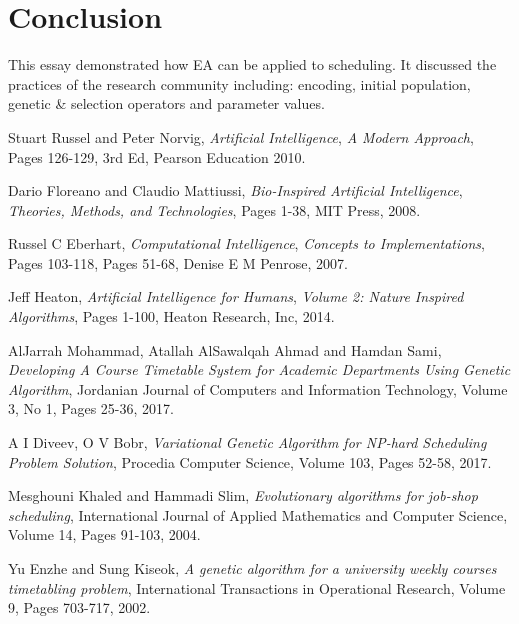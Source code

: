 \documentclass[a4paper, 12pt, titlepage]{article}
\begin{document}
\section*{Conclusion}

This essay demonstrated how EA can be applied to scheduling.  It
discussed the practices of the research community including: encoding,
initial population, genetic \& selection operators and parameter values.

\begin{thebibliography}{10}


  Stuart Russel and Peter Norvig,
  \textit{Artificial Intelligence},
  \textit{A Modern Approach},
  Pages 126-129, 
  3rd Ed, 
  Pearson Education
  2010.

  Dario Floreano and Claudio Mattiussi,
  \textit{Bio-Inspired Artificial Intelligence},
  \textit{Theories, Methods, and Technologies},
  Pages 1-38,
  MIT Press,
  2008.

  Russel C Eberhart,
  \textit{Computational Intelligence},
  \textit{Concepts to Implementations},
  Pages 103-118,
  Pages 51-68,
  Denise E M Penrose,
  2007.

  Jeff Heaton,
  \textit{Artificial Intelligence for Humans},
  \textit{Volume 2: Nature Inspired Algorithms},
  Pages 1-100,
  Heaton Research, Inc,
  2014.


  AlJarrah Mohammad, Atallah AlSawalqah Ahmad and Hamdan Sami, 
  \textit{Developing A Course Timetable System for Academic Departments Using Genetic Algorithm},
  Jordanian Journal of Computers and Information Technology,
  Volume 3,
  No 1,
  Pages 25-36,
  2017.

  A I Diveev, O V Bobr,
  \textit{Variational Genetic Algorithm for NP-hard Scheduling Problem Solution},
  Procedia Computer Science,
  Volume 103,
  Pages 52-58,
  2017.

  Mesghouni Khaled and Hammadi Slim,
  \textit{Evolutionary algorithms for job-shop scheduling}, 
  International Journal of Applied Mathematics and Computer Science,
  Volume 14,
  Pages 91-103,
  2004.

  Yu Enzhe and Sung Kiseok, 
  \textit{A genetic algorithm for a university weekly courses timetabling problem}, 
  International Transactions in Operational Research,
  Volume 9,
  Pages 703-717,
  2002.


\end{thebibliography}
\end{document}
